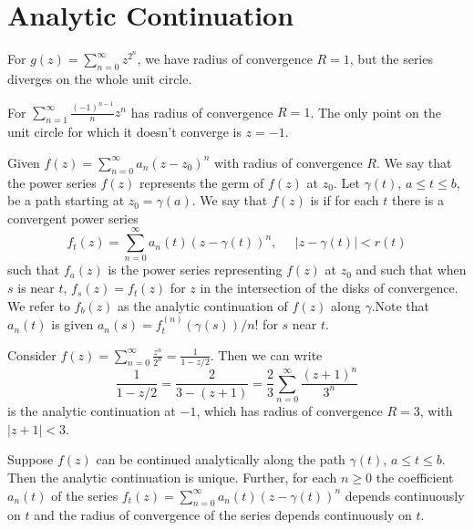 \documentclass[12pt, a4paper, oneside, openright, titlepage]{book}
\begin{document}
\section{Analytic Continuation}

\begin{eg}
    For $g(z) = \sum_{n=0}^{\infty}z^{2^n}$, we have radius of convergence $R = 1$, but the series diverges on the whole unit circle.
\end{eg}

\begin{eg}
    For $\sum_{n=1}^{\infty}\frac{(-1)^{n-1}}{n}z^n$ has radius of convergence $R = 1$. The only point on the unit circle for which it doesn't converge is $z = -1$.
\end{eg}



Given $f(z) = \sum_{n=0}^{\infty}a_n(z-z_0)^n$ with radius of convergence $R$. We say that the power series $f(z)$ represents the germ of $f(z)$ at $z_0$. Let $\gamma(t)$, $a \leq t \leq b$, be a path starting at $z_0 = \gamma(a)$. We say that $f(z)$ is  if for each $t$ there is a convergent power series \begin{equation*}
    f_t(z) = \sum_{n=0}^{\infty}a_n(t)(z-\gamma(t))^n,\;\;\;\;\;|z-\gamma(t)| < r(t)
\end{equation*}
such that $f_a(z)$ is the power series representing $f(z)$ at $z_0$ and such that when $s$ is near $t$, $f_s(z) = f_t(z)$ for $z$ in the intersection of the disks of convergence. We refer to $f_b(z)$ as the analytic continuation of $f(z)$ along $\gamma$.Note that $a_n(t)$ is given $a_n(s) = f_t^{(n)}(\gamma(s))/n!$ for $s$ near $t$.

\begin{eg}
    Consider $f(z) = \sum_{n=0}^{\infty}\frac{z^n}{2^n} = \frac{1}{1-z/2}$. Then we can write \begin{equation*}
        \frac{1}{1-z/2} = \frac{2}{3-(z+1)} = \frac{2}{3}\sum_{n=0}^{\infty}\frac{(z+1)^n}{3^n}
    \end{equation*}
    is the analytic continuation at $-1$, which has radius of convergence $R = 3$, with $|z+1| < 3$.
\end{eg}


\begin{thm}
    Suppose $f(z)$ can be continued analytically along the path $\gamma(t)$, $a \leq t \leq b$. Then the analytic continuation is unique. Further, for each $n \geq 0$ the coefficient $a_n(t)$ of the series $f_t(z) = \sum_{n=0}^{\infty}a_n(t)(z-\gamma(t))^n$ depends continuously on $t$ and the radius of convergence of the series depends continuously on $t$.
\end{thm}
\end{document}
